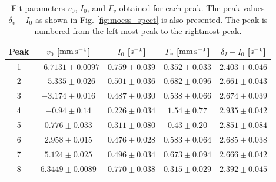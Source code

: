 \documentclass[a4paper]{report}
\numberwithin{equation}{section}
\begin{document}
\begin{table}[!ht]
    \centering
    \begin{tabular}{|c|c|c|c|c|}
    \hline
    Peak & $v_0$ [$\si[]{\milli\meter\per\second}$] & $I_0$ [$\si[]{\per\second}$] & $\Gamma_v$ [$\si[]{\milli\meter\per\second}$] & $\delta_I - I_0$ [$\si[]{\per\second}$]\\ \hline
        1 &$-6.7131 \pm 0.0097 $& $0.759 \pm 0.039$ & $0.352 \pm 0.033$ & $2.403 \pm 0.046$ \\ \hline
        2 &$-5.335 \pm 0.026 $& $0.501 \pm 0.036$ & $0.682 \pm 0.096$ & $2.661 \pm 0.043$ \\ \hline
        3 &$-3.174 \pm 0.016 $& $0.487 \pm 0.030$ & $0.538 \pm 0.066$ & $2.674 \pm 0.039$ \\ \hline
        4 &$-0.94 \pm 0.14 $& $0.226 \pm 0.034$ & $1.54 \pm 0.77$ & $2.935 \pm 0.042$ \\ \hline
        5 &$ 0.776 \pm 0.033 $& $0.311 \pm 0.080$ & $0.43 \pm 0.20$ & $2.851 \pm 0.084$ \\ \hline
        6 &$ 2.958 \pm 0.015 $& $0.476 \pm 0.028$ & $0.583 \pm 0.064$ & $2.685 \pm 0.038$ \\ \hline
        7 &$ 5.124 \pm 0.025 $& $0.496 \pm 0.034$ & $0.673 \pm 0.094$ & $2.666 \pm 0.042$ \\ \hline
        8 &$ 6.3449 \pm 0.0089 $& $0.770 \pm 0.038$ & $0.315 \pm 0.029$ & $2.392 \pm 0.045$ \\ \hline
    \end{tabular}
    \caption{Fit parameters $v_0$, $I_0$, and $\Gamma_v$ obtained for each peak. The peak values $\delta_v - I_0$ 
			as shown in Fig. \ref{fig:moess_spect} is also presented.
			 The peak is numbered from the left most peak to the rightmost peak.}
	\label{tab:fit_params}
\end{table}

\end{document}
